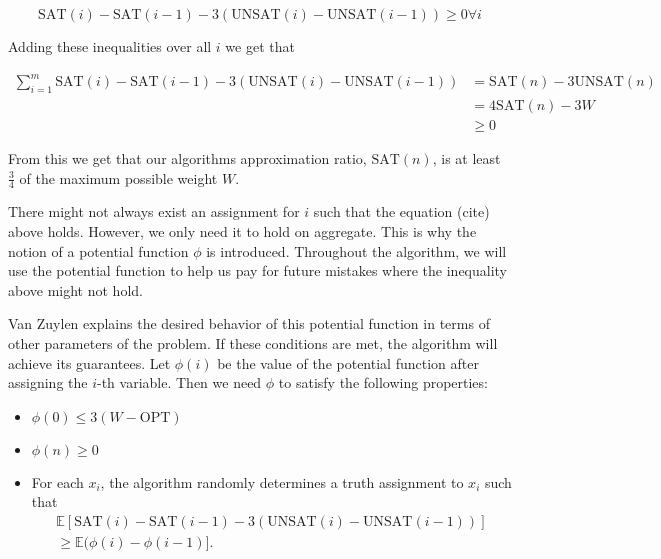 \documentclass[11pt,letter]{article}
\begin{document}
\begin{equation}
\label{eq:1}
\text{SAT}(i)-\text{SAT}(i-1) - 3\left(\text{UNSAT}(i) - \text{UNSAT}(i-1)\right) \geq 0 \forall i
\end{equation}

Adding these inequalities over all $i$ we get that 

\begin{equation*}
\begin{aligned}
\sum_{i = 1}^{m} \text{SAT}(i)-\text{SAT}(i-1) - 3\left(\text{UNSAT}(i) - \text{UNSAT}(i-1)\right)  & = \text{SAT}(n) - 3\text{UNSAT}(n) \\
& = 4\text{SAT}(n) - 3W \\
& \geq 0 
\end{aligned}
\end{equation*}

From this we get that our algorithms approximation ratio, $\text{SAT}(n)$, is at least $\frac{3}{4}$ of the maximum possible weight $W$. 

There might not always exist an assignment for $i$ such that the equation (cite) above holds. However, we only need it to hold on aggregate. 
This is why the notion of a potential function $\phi$ is introduced. Throughout the algorithm, we will use the potential function to help us pay 
for future mistakes where the inequality above might not hold. 

Van Zuylen explains the desired behavior of this potential function in terms of other parameters of the problem. If these conditions are met, the algorithm
will achieve its guarantees. Let $\phi(i)$ be the value of the potential function after assigning the $i$-th variable. Then we need $\phi$ to satisfy the following properties:

\begin{itemize}
	\item $\phi(0) \leq 3(W-\text{OPT})$
	\item $\phi(n) \geq 0$
	\item For each $x_i$, the algorithm randomly determines a truth assignment to $x_i$ such that 
\begin{equation}
\begin{aligned}
\label{eq:2}
\mathbb{E}[\text{SAT}(i) - \text{SAT}(i-1) - 3\left(\text{UNSAT}(i)-\text{UNSAT}(i-1)\right)] \\
\geq \mathbb{E}(\phi(i) - \phi(i-1)].
\end{aligned}
\end{equation}
\end{itemize}
\end{document}
